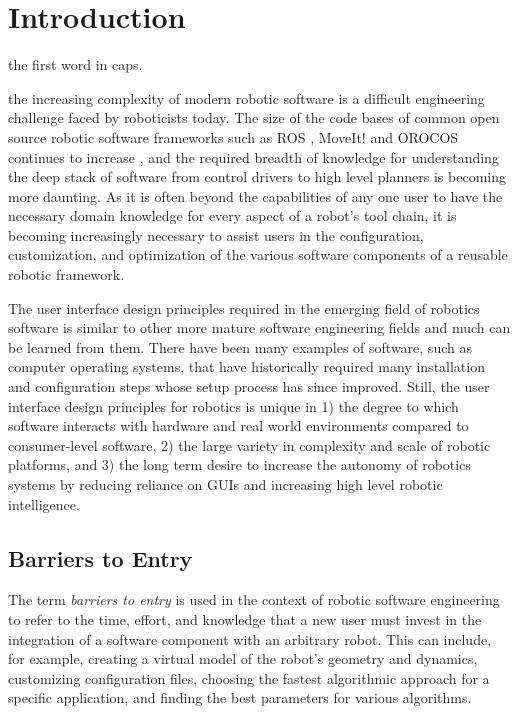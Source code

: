 \documentclass[10pt,journal,compsoc]{joser1}
\begin{document}
\section{Introduction}
the first word in caps.
 {the increasing complexity of modern robotic software
is a difficult engineering challenge faced by roboticists today. The size of the
code bases of common open source robotic software frameworks such as ROS
\cite{quigley2009ros}, MoveIt! \cite{moveit} and OROCOS
\cite{bruyninckx2001open} continues to increase \cite{makarenko2007benefits},
and the required breadth of knowledge for understanding the deep stack of
software from control drivers to high level planners is becoming more daunting.
As it is often beyond the capabilities of any one user to have the necessary
domain knowledge for every aspect of a robot's tool chain, it is becoming
increasingly necessary to assist users in the configuration, customization, and
optimization of the various software components of a reusable robotic
framework. 

The user interface design principles required in the emerging field of robotics
software is similar to other more mature software engineering fields and much
can be learned from them. There have been many examples of software, such as
computer operating systems, that have historically required many installation
and configuration steps whose setup process has since improved. Still, the user 
interface design principles for robotics is unique in 1) the degree to which software interacts with
hardware and real world environments compared to consumer-level software, 2) the large variety in complexity and
scale of robotic platforms, and 3) the long term desire to increase the autonomy
of robotics systems by reducing reliance on GUIs and increasing high level
robotic intelligence. 

\subsection{Barriers to Entry} 

The term \textit{barriers to entry} is used in the context of robotic software
engineering to refer to the time, effort, and knowledge that a new user must
invest in the integration of a software component with an arbitrary robot. This
can include, for example, creating a virtual model of the robot's geometry and
dynamics, customizing configuration files, choosing the fastest algorithmic
approach for a specific application, and finding the best parameters for various
algorithms.

}
\end{document}
